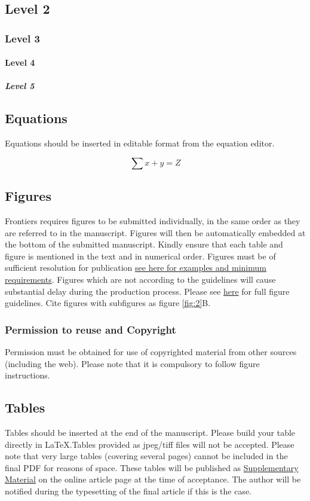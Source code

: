 \documentclass[utf8]{frontiersSCNS} %
\begin{document}

\subsection{Level 2}
\subsubsection{Level 3}
\paragraph{Level 4}
\subparagraph{Level 5}

\subsection{Equations}
Equations should be inserted in editable format from the equation editor.

\begin{equation}
\sum x+ y =Z\label{eq:01}
\end{equation}

\subsection{Figures}
Frontiers requires figures to be submitted individually, in the same order as they are referred to in the manuscript. Figures will then be automatically embedded at the bottom of the submitted manuscript. Kindly ensure that each table and figure is mentioned in the text and in numerical order. Figures must be of sufficient resolution for publication \href{http://home.frontiersin.org/about/author-guidelines#ResolutionRequirements}{see here for examples and minimum requirements}. Figures which are not according to the guidelines will cause substantial delay during the production process. Please see \href{http://home.frontiersin.org/about/author-guidelines#GeneralStyleGuidelinesforFigures}{here} for full figure guidelines. Cite figures with subfigures as figure \ref{fig:2}B.

\subsubsection{Permission to reuse and Copyright}
Permission must be obtained for use of copyrighted material from other sources (including the web). Please note that it is compulsory to follow figure instructions. 

\subsection{Tables}
Tables should be inserted at the end of the manuscript. Please build your table directly in LaTeX.Tables provided as jpeg/tiff files will not be accepted. Please note that very large tables (covering several pages) cannot be included in the final PDF for reasons of space. These tables will be published as \href{http://home.frontiersin.org/about/author-guidelines#SupplementaryMaterial}{Supplementary Material} on the online article page at the time of acceptance. The author will be notified during the typesetting of the final article if this is the case. 
\end{document}
